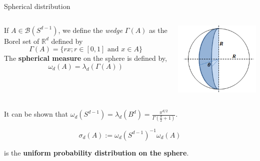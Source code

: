 \documentclass[10pt]{beamer}
\begin{document}
  \begin{frame}{Spherical distribution}

    \begin{columns}
      \begin{column}{0.75\textwidth}

        \begin{definition}
          If $A \in \mathcal{B}\left(S^{d-1}\right)$, we define the \emph{wedge}
          $\Gamma(A)$ as the Borel set
          of $\mathbb{R}^{d}$ defined by
          $$
          \Gamma(A)=\{r x ; r \in[0,1] \text { and } x \in A\}
          $$
          \pause
          The \textbf{spherical measure} on the sphere is defined by,
          $$
          \omega_{d}(A)=\lambda_{d}(\Gamma(A))
          $$
        \end{definition}
      \end{column}
      \pause
      \begin{column}{0.25\textwidth}  %
        \begin{center}
          \includegraphics[width=1\textwidth]{wedge.png}
        \end{center}
      \end{column}
    \end{columns}

    \pause

    It can be shown that $\omega_d(S^{d-1}) = \lambda_d(B^d)  = \frac{\pi^{d /
        2}}{\Gamma\left(\frac{d}{2} + 1\right)} $.
    \pause

    \begin{equation*}
      \sigma_{d}(A):= \omega_d(S^{d-1})^{-1} \omega_d(A)
    \end{equation*}

    is the \textbf{uniform probability distribution on the sphere}.

  \end{frame}
\end{document}
